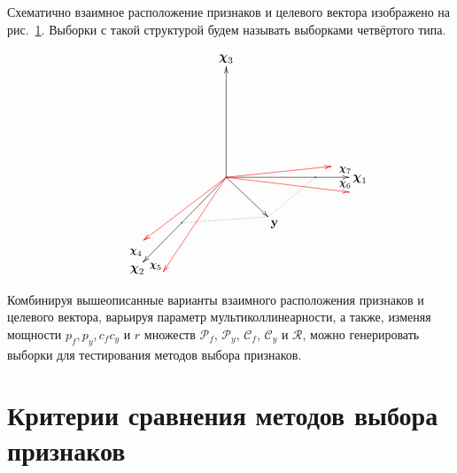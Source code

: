 \documentclass[a4paper,12pt]{article}
\newcommand{\by}{\mathbf{y}}
\newcommand{\bchi}{\boldsymbol{\chi}}
\newcommand{\calC}{\mathcal{C}}
\newcommand{\calP}{\mathcal{P}}
\newcommand{\calR}{\mathcal{R}}
\theoremstyle{plain}
\begin{document}
\begin{enumerate}
Схематично взаимное расположение признаков и целевого вектора изображено на рис.~\ref{fig:sumort}. Выборки с такой структурой будем называть выборками четвёртого типа.  

\begin{figure}[!h]
\begin{equation*}
\xymatrix{
& & & \bchi_3 & & & \\
& & &     & & & \\
& & &     & & & \\
& & & *=0{.}\ar[uuu] %
\ar[rrr]_>>{\large \bchi_6}^>>{\large \bchi_7} %
\ar[lldd]_>>{\large \bchi_4}^>>{\large \bchi_5} %
\ar@[red][rrr]!/va(160) 25pt/ %
\ar@[red][rrr]!/va(-90) 13pt/ %
\ar@[red][ddl]+/va(190) 15pt/ %
\ar[rd]
\ar@[red][lld]+/va(-70) 15pt/ & & *={.}\ar@{.}[dl]+/va(140) 7pt/ & \bchi_1 \\
& & *={.}\ar@{.}[rr]!/va(90) 5pt/ & & \by & & \\
& \bchi_2 & & & &  
}
\end{equation*}
\caption{}
\label{fig:sumort}
\end{figure}

%
%
%
\end{enumerate}

Комбинируя вышеописанные варианты взаимного расположения признаков и целевого вектора, варьируя параметр мультиколлинеарности, а также, изменяя мощности $p_f, p_y, c_f c_y$ и $r$ множеств $\calP_f$, $\calP_y$, $\calC_f$, $\calC_y$ и $\calR$, можно генерировать выборки для тестирования методов выбора признаков. 

\section{Критерии сравнения методов выбора признаков}
\end{document}
